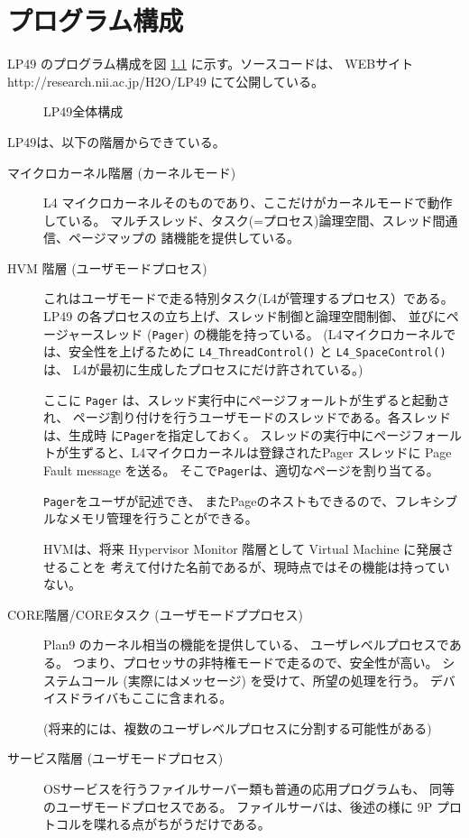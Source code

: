 \chapter{プログラム構成}

      LP49 のプログラム構成を図 \ref{fig:LP49general} に示す。ソースコードは、
      WEBサイト http://research.nii.ac.jp/H2O/LP49  にて公開している。

\begin{figure}[hbt]
  \begin{center}
   \epsfxsize=440pt
    \caption{LP49全体構成}
    \label{fig:LP49general}
  \end{center}
\end{figure}



      LP49は、以下の階層からできている。
\begin{description}
\item[マイクロカーネル階層  (カーネルモード)]
       L4 マイクロカーネルそのものであり、ここだけがカーネルモードで動作している。
       マルチスレッド、タスク(=プロセス)論理空間、スレッド間通信、ページマップの
       諸機能を提供している。
    
\item[HVM 階層 (ユーザモードプロセス)]
      これはユーザモードで走る特別タスク(L4が管理するプロセス）である。
      LP49 の各プロセスの立ち上げ、スレッド制御と論理空間制御、
    並びにページャースレッド ({\tt Pager}) の機能を持っている。
    (L4マイクロカーネルでは、安全性を上げるために 
    \verb$L4_ThreadControl()$ と \verb$L4_SpaceControl()$は、
    L4が最初に生成したプロセスにだけ許されている。)


    ここに {\tt Pager} は、スレッド実行中にページフォールトが生ずると起動され、
    ページ割り付けを行うユーザモードのスレッドである。各スレッドは、生成時
    に{\tt Pager}を指定しておく。
    スレッドの実行中にページフォールトが生ずると、L4マイクロカーネルは登録されたPager
    スレッドに Page Fault message を送る。
    そこで{\tt Pager}は、適切なページを割り当てる。

    {\tt Pager}をユーザが記述でき、
    またPageのネストもできるので、フレキシブルなメモリ管理を行うことができる。

    HVMは、将来 Hypervisor Monitor 階層として Virtual Machine に発展させることを
    考えて付けた名前であるが、現時点ではその機能は持っていない。
    
\item[CORE階層/COREタスク  (ユーザモードププロセス)]
      Plan9 のカーネル相当の機能を提供している、
      ユーザレベルプロセスである。
      つまり、プロセッサの非特権モードで走るので、安全性が高い。
     システムコール (実際にはメッセージ) を受けて、所望の処理を行う。
     デバイスドライバもここに含まれる。

     (将来的には、複数のユーザレベルプロセスに分割する可能性がある)

    
\item[サービス階層 (ユーザモードプロセス)]
       OSサービスを行うファイルサーバー類も普通の応用プログラムも、
     同等のユーザモードプロセスである。
    ファイルサーバは、後述の様に 9P プロトコルを喋れる点がちがうだけである。 
\end{description}
